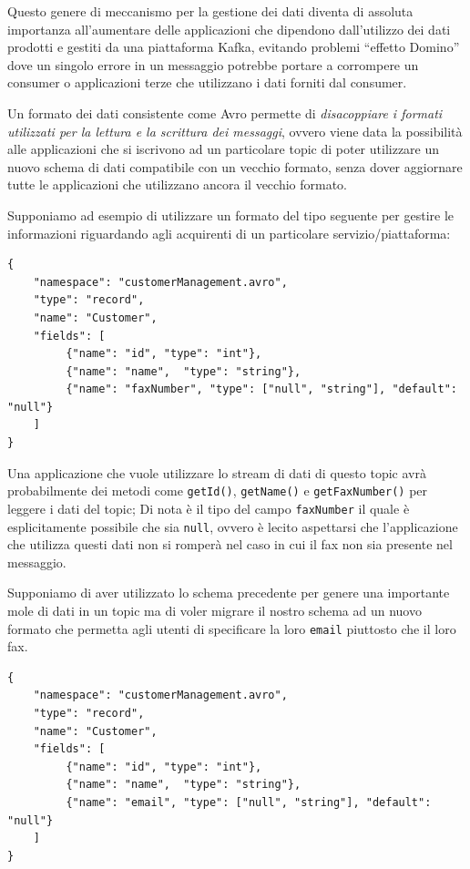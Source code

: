 \documentclass[]{article}
\begin{document}
Questo genere di meccanismo per la gestione dei dati diventa di assoluta
importanza all'aumentare delle applicazioni che dipendono dall'utilizzo
dei dati prodotti e gestiti da una piattaforma Kafka, evitando problemi
``effetto Domino'' dove un singolo errore in un messaggio potrebbe
portare a corrompere un consumer o applicazioni terze che utilizzano i
dati forniti dal consumer.

Un formato dei dati consistente come Avro permette di \emph{disacoppiare
i formati utilizzati per la lettura e la scrittura dei messaggi}, ovvero
viene data la possibilità alle applicazioni che si iscrivono ad un
particolare topic di poter utilizzare un nuovo schema di dati
compatibile con un vecchio formato, senza dover aggiornare tutte le
applicazioni che utilizzano ancora il vecchio formato.

Supponiamo ad esempio di utilizzare un formato del tipo seguente per
gestire le informazioni riguardando agli acquirenti di un particolare
servizio/piattaforma:

\small 

\begin{verbatim}
{
    "namespace": "customerManagement.avro",
    "type": "record",
    "name": "Customer",
    "fields": [
         {"name": "id", "type": "int"},
         {"name": "name",  "type": "string"},
         {"name": "faxNumber", "type": ["null", "string"], "default": "null"}
    ] 
}
\end{verbatim}

\normalsize

Una applicazione che vuole utilizzare lo stream di dati di questo topic
avrà probabilmente dei metodi come \texttt{getId()}, \texttt{getName()}
e \texttt{getFaxNumber()} per leggere i dati del topic; Di nota è il
tipo del campo \texttt{faxNumber} il quale è esplicitamente possibile
che sia \texttt{null}, ovvero è lecito aspettarsi che l'applicazione che
utilizza questi dati non si romperà nel caso in cui il fax non sia
presente nel messaggio.

Supponiamo di aver utilizzato lo schema precedente per genere una
importante mole di dati in un topic ma di voler migrare il nostro schema
ad un nuovo formato che permetta agli utenti di specificare la loro
\texttt{email} piuttosto che il loro fax.

\small

\begin{verbatim}
{
    "namespace": "customerManagement.avro",
    "type": "record",
    "name": "Customer",
    "fields": [
         {"name": "id", "type": "int"},
         {"name": "name",  "type": "string"},
         {"name": "email", "type": ["null", "string"], "default": "null"}
    ] 
}
\end{verbatim}
\end{document}
